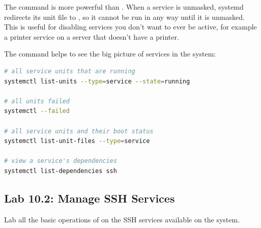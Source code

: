The  command is more powerful than . When a service is unmasked, systemd redirects its unit file to , so it cannot be run in any way until it is unmasked. This is useful for disabling services you don't want to ever be active, for example a printer service on a server that doesn't have a printer.

The  command helps to see the big picture of services in the system:

\begin{lstlisting}[language=bash, caption={View and filter unit lists}]
# all service units that are running
systemctl list-units --type=service --state=running

# all units failed
systemctl --failed

# all service units and their boot status
systemctl list-unit-files --type=service

# view a service's dependencies
systemctl list-dependencies ssh
\end{lstlisting}

\subsection*{Lab 10.2: Manage SSH Services}

Lab all the basic operations of  on the SSH services available on the system.

